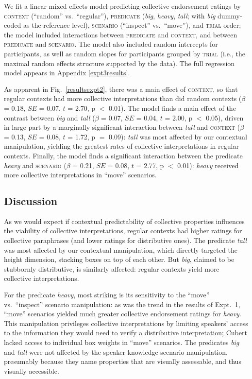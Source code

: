 \documentclass[linguex]{sp}
\begin{document}
We fit a linear mixed effects model predicting collective endorsement ratings by \textsc{context} (``random'' vs.~``regular''),
\textsc{predicate} (\emph{big}, \emph{heavy}, \emph{tall}; with \emph{big} dummy-coded as the reference level),
 \textsc{scenario} (``inspect'' vs.~``move''), and \textsc{trial} order; the model included interactions between \textsc{predicate} and \textsc{context}, and between \textsc{predicate} and \textsc{scenario}. The model also included random intercepts for participants, as well as random slopes for participants grouped by \textsc{trial} (i.e., the maximal random effects structure supported by the data). The full regression model appears in Appendix \ref{expt3results}.

As apparent in Fig.~\ref{resultsexpt2}, there was a main effect of \textsc{context}, so that regular contexts had more collective interpretations than did random contexts ($\beta$ = 0.18, $SE$ = 0.07, $t$ = 2.70, p $<$ 0.01). The model finds a main effect of the contrast between \emph{big} and \emph{tall} ($\beta$ = 0.07, $SE$ = 0.04, $t$ = 2.00, p $<$ 0.05), driven in large part by a marginally significant interaction between \emph{tall} and \textsc{context} ($\beta$ = 0.13, $SE$ = 0.08, $t$ = 1.72, p $=$ 0.09): \emph{tall} was most affected by our contextual manipulation, yielding the greatest rates of collective interpretations in regular contexts. Finally, the model finds a significant interaction between the predicate \emph{heavy} and \textsc{scenario} ($\beta$ = 0.21, $SE$ = 0.08, $t$ = 2.77, p $<$ 0.01): \emph{heavy} received more collective interpretations in ``move'' scenarios.

\subsection{Discussion}

As we would expect if contextual predictability of collective properties influences the viability of collective interpretations, regular contexts had higher ratings for collective paraphrases (and lower ratings for distributive ones). The predicate \textit{tall} was most affected by our contextual manipulation, which directly targeted the height dimension, stacking boxes on top of each other. But \emph{big}, claimed to be stubbornly distributive, is similarly affected: regular contexts yield more collective interpretations. 

For the predicate \emph{heavy}, most striking is its sensitivity to the ``move'' vs.~``inspect'' scenario manipulation: as was the trend in the results of Expt.~1, ``move'' scenarios yielded much greater collective endorsement ratings for \emph{heavy}. This manipulation privileges collective interpretations by limiting speakers' access to the information they would need to verify a distributive interpretation; Cubert lacked access to individual box weights in ``move'' scenarios. The predicates \emph{big} and \emph{tall} were not affected by the speaker knowledge scenario manipulation, presumably because they name properties that are visually assessable, and thus visually accessible.
\end{document}

